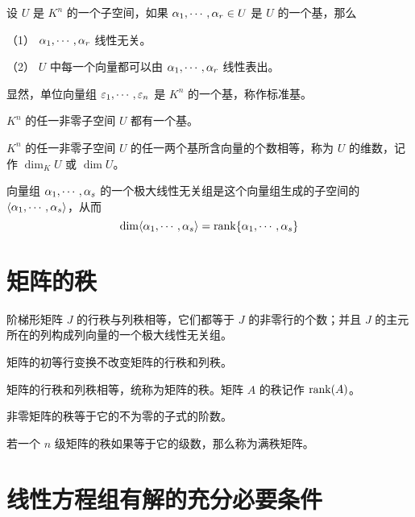 \begin{definition}[子空间]
	设 $U$ 是 $K^n$ 的一个子空间，如果 $\alpha_1,\cdots,\alpha_r\in U$ 是 $U$ 的一个基，那么

	（1） $\alpha_1,\cdots,\alpha_r$ 线性无关。

	（2） $U$ 中每一个向量都可以由 $\alpha_1,\cdots,\alpha_r$ 线性表出。
\end{definition}

显然，单位向量组 $\varepsilon_1,\cdots,\varepsilon_n$ 是 $K^n$ 的一个基，称作标准基。

\begin{theorem}
	$K^n$ 的任一非零子空间 $U$ 都有一个基。
\end{theorem}

\begin{theorem}
	$K^n$ 的任一非零子空间 $U$ 的任一两个基所含向量的个数相等，称为 $U$ 的维数，记作 $\dim_KU$ 或 $\dim U$。
\end{theorem}

\begin{theorem}
	向量组 $\alpha_1,\cdots,\alpha_s$ 的一个极大线性无关组是这个向量组生成的子空间的 $\langle \alpha_1,\cdots,\alpha_s \rangle$，从而
	\[\dim\langle \alpha_1,\cdots,\alpha_s \rangle = \operatorname{rank}\{\alpha_1,\cdots,\alpha_s\}\]
\end{theorem}

\section{矩阵的秩}

\begin{theorem}
	阶梯形矩阵 $J$ 的行秩与列秩相等，它们都等于 $J$ 的非零行的个数；并且 $J$ 的主元所在的列构成列向量的一个极大线性无关组。
\end{theorem}

\begin{theorem}
	矩阵的初等行变换不改变矩阵的行秩和列秩。
\end{theorem}

\begin{theorem}
	矩阵的行秩和列秩相等，统称为矩阵的秩。矩阵 $A$ 的秩记作 $\operatorname{rank}(A)$。
\end{theorem}

\begin{theorem}
	非零矩阵的秩等于它的不为零的子式的阶数。
\end{theorem}

若一个 $n$ 级矩阵的秩如果等于它的级数，那么称为满秩矩阵。

\section{线性方程组有解的充分必要条件}

